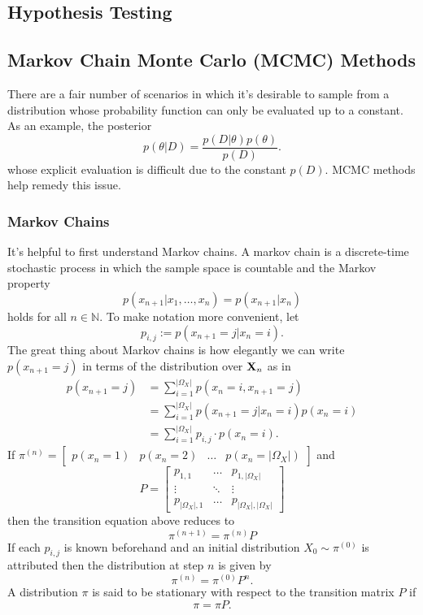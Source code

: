 \documentclass[11pt]{article}
\begin{document}
\begin{appendices}
\subsection{Hypothesis Testing}

\subsection{Markov Chain Monte Carlo (MCMC) Methods}
There are a fair number of scenarios in which it's desirable to sample from a distribution whose probability function can only be evaluated up to a constant. As an example, the posterior
$$
p(\theta|D)
=
\frac{p(D|\theta)p(\theta)}{p(D)}.
$$
whose explicit evaluation is difficult due to the constant $p(D)$. MCMC methods help remedy this issue.

\subsubsection{Markov Chains}
It's helpful to first understand Markov chains. A markov chain is a discrete-time stochastic process in which the sample space is countable and the Markov property
$$
p(x_{n+1}|x_1,\dots,x_n)
=
p(x_{n+1}|x_n)
$$
holds for all $n\in\mathbb{N}$. To make notation more convenient, let
$$
p_{i,j}
:=
p(x_{n+1}=j|x_n=i).
$$
The great thing about Markov chains is how elegantly we can write $p(x_{n+1}=j)$ in terms of the distribution over $\mathbf{X}_n$ as in
\begin{align*}
    p(x_{n+1}=j)
    &=
    \sum_{i=1}^{|\Omega_X|} p(x_n=i,x_{n+1}=j)\\
    &=
    \sum_{i=1}^{|\Omega_X|} p(x_{n+1}=j|x_n=i)p(x_n=i)\\
    &=
    \sum_{i=1}^{|\Omega_X|} p_{i,j}\cdot p(x_n=i).
\end{align*}
If $\pi^{(n)}=\begin{bmatrix} p(x_n=1) & p(x_n=2) & \dots & p(x_n=|\Omega_X|)\end{bmatrix}$ and
$$
P
=
\begin{bmatrix}
    p_{1,1}          & \dots  & p_{1,|\Omega_X|}\\
    \vdots           & \ddots & \vdots          \\
    p_{|\Omega_X|,1} & \dots  & p_{|\Omega_X|, |\Omega_X|}
\end{bmatrix}
$$
then the transition equation above reduces to
$$
\pi^{(n+1)}
=
\pi^{(n)}P
$$
If each $p_{i,j}$ is known beforehand and an initial distribution $X_0\sim\pi^{(0)}$ is attributed then the distribution at step $n$ is given by
$$
\pi^{(n)}
=
\pi^{(0)}P^n.
$$
A distribution $\pi$ is said to be stationary with respect to the transition matrix $P$ if
$$
\pi
=
\pi P.
$$


\end{appendices}
\end{document}
